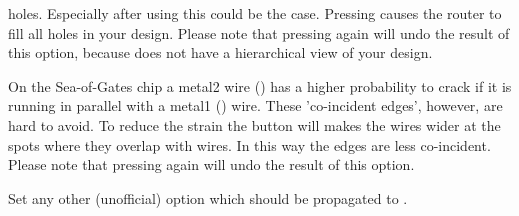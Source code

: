 \begin{description}
holes. Especially after using  this could
be the case.  Pressing  causes the
router to fill all holes in your design. Please note that
pressing  again will undo the result of this
option, because  does not have a hierarchical
view of your design.
\item[\button{overlap wires}] 
On the Sea-of-Gates chip a metal2 wire () has a
higher probability to crack if it is running in parallel
with a metal1 () wire. These 'co-incident edges',
however, are hard to avoid. To reduce the strain the button
 will makes the  wires wider
at the spots where they overlap with  wires. In
this way the edges are less co-incident.  Please note that
pressing  again will undo the result of this
option.
\item[\button{options}]
Set any other (unofficial) option which should be
propagated to .
\end{description}


\cleardoublepage
